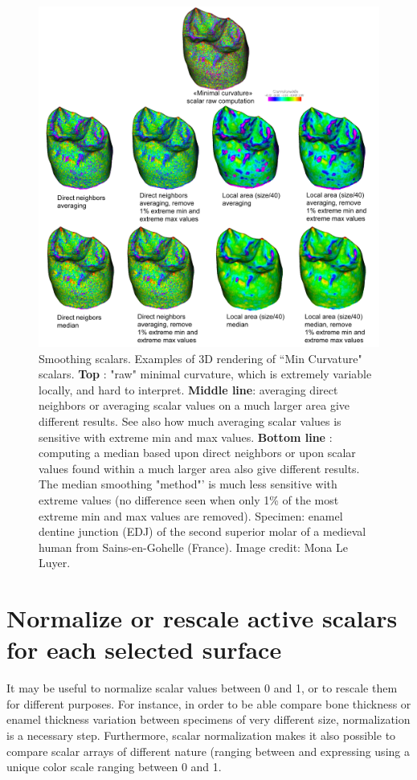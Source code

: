 \begin{figure}
  \centering
  \includegraphics[scale=0.2]{images/11/scalar_smoothing_example.png} 
	\caption{ 
Smoothing scalars. Examples of 3D rendering of ``Min Curvature" scalars. \textbf{Top} : "raw" minimal curvature, which is extremely variable locally, and hard to interpret.  \textbf{Middle line}: averaging direct neighbors  or averaging scalar values on a much larger area give different results. See also how much averaging scalar values is sensitive with extreme min and max values. \textbf{Bottom line} : computing a median based upon direct neighbors  or upon scalar values found within a much larger area also give different results. The median smoothing "method"' is much less sensitive with extreme values (no difference seen when only 1\% of the most extreme min and max values are removed).  Specimen: enamel dentine junction (EDJ) of the second superior molar of a medieval human from Sains-en-Gohelle (France). Image credit: Mona Le Luyer.	
	}
\label{smoothing_scalars_example}
\end{figure}


\section{Normalize or rescale active scalars for each selected surface}
It may be useful to normalize scalar values between 0 and 1, or to rescale them for different purposes. For instance, in order to be able compare bone thickness or enamel thickness variation between specimens of very different size, normalization is a necessary step. Furthermore, scalar normalization makes it also possible to compare scalar arrays of different nature (ranging between and expressing using a unique color scale ranging between 0 and 1. 

